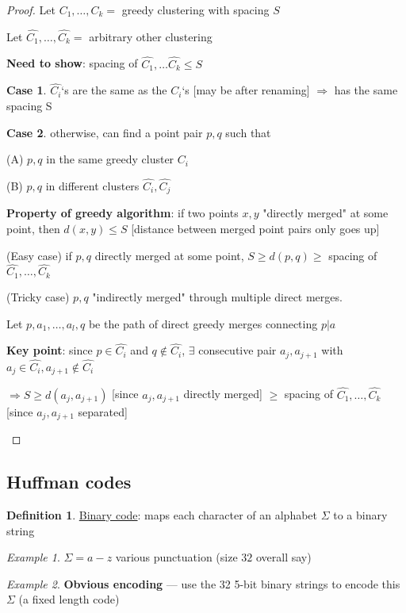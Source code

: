 \documentclass[a4paper,12pt]{article}
\theoremstyle{plain}
\theoremstyle{definition}
\newtheorem*{definition}{Definition}
\newtheorem{case}{Case}[subsection]
\theoremstyle{remark}
\newtheorem*{example}{Example}
\begin{document}
\begin{proof}
Let $C_1, \dots, C_k =$ greedy clustering with spacing $S$

Let $\widehat{C_1}, \dots, \widehat{C_k} =$ arbitrary other clustering

\textbf{Need to show}: spacing of $\widehat{C_1}, \dots \widehat{C_k} \leq S$

\begin{case}$\widehat{C_i}$`s are the same as the $C_i$`s [may be after renaming] $\Rightarrow$ has the same spacing S\end{case}
\begin{case}
otherwise, can find a point pair $p, q$ such that
\begin{description}
	\item{(A)} $p, q$ in the same greedy cluster $C_i$
	\item{(B)} $p, q$ in different clusters $\widehat{C_i}, \widehat{C_j}$
\end{description}

\textbf{Property of greedy algorithm}: if two points $x, y$ "directly merged" at some point, then $d(x, y) \leq S$ [distance between merged point pairs only goes up]

\begin{description}
	\item{(Easy case)} if $p, q$ directly merged at some point, $S \geq d(p, q) \geq$ spacing of $\widehat{C_1}, \dots, \widehat{C_k}$
	\item{(Tricky case)} $p, q$ "indirectly merged" through multiple direct merges.

	Let $p, a_1, \dots, a_l, q$ be the path of direct greedy merges connecting $p|a$

	\textbf{Key point}: since $p \in \widehat{C_i}$ and $q \notin \widehat{C_i}$, $\exists$ consecutive pair $a_j, a_{j+1}$ with $a_j \in \widehat{C_i}, a_{j+1} \notin \widehat{C_i}$

	$\Rightarrow S \geq d(a_j, a_{j+1})$ [since $a_j, a_{j+1}$ directly merged] $\geq$ spacing of $\widehat{C_1}, \dots, \widehat{C_k}$ [since $a_j, a_{j+1}$ separated]
\end{description}

\end{case}
\end{proof}



\subsection{Huffman codes}
\begin{definition}\underline{Binary code}: maps each character of an alphabet $\Sigma$ to a binary string\end{definition}
\begin{example}$\Sigma = a-z$ various punctuation (size $32$ overall say)\end{example}
\begin{example}\textbf{Obvious encoding} --- use the 32 5-bit binary strings to encode this $\Sigma$ (a fixed length code)\end{example}
\end{document}
